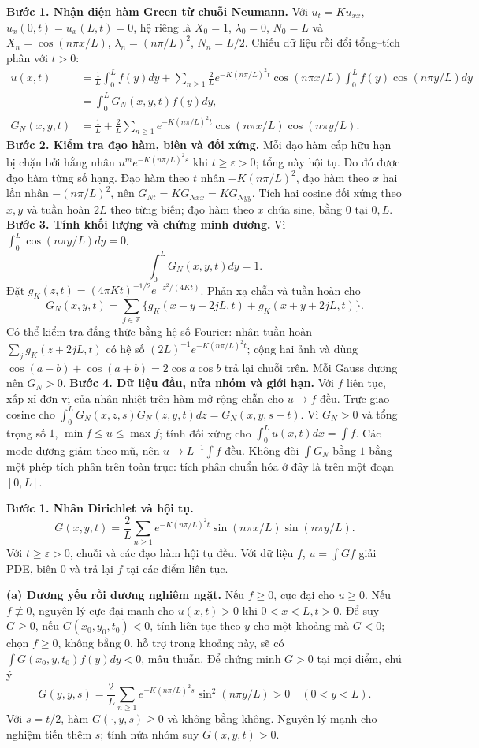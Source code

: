 \textbf{Bước 1. Nhận diện hàm Green từ chuỗi Neumann.}
Với $u_t=Ku_{xx}$, $u_x(0,t)=u_x(L,t)=0$, hệ riêng là $X_0=1$, $\lambda_0=0$, $N_0=L$ và $X_n=\cos(n\pi x/L)$, $\lambda_n=(n\pi/L)^2$, $N_n=L/2$. Chiếu dữ liệu rồi đổi tổng–tích phân với $t>0$:
\begin{align*}
u(x,t)&=\frac1L\int_0^Lf(y)dy+
\sum_{n\ge1}\frac2L e^{-K(n\pi/L)^2t}\cos(n\pi x/L)\int_0^Lf(y)\cos(n\pi y/L)dy\\
&=\int_0^LG_N(x,y,t)f(y)dy,\\
G_N(x,y,t)&=\frac1L+\frac2L\sum_{n\ge1}e^{-K(n\pi/L)^2t}
\cos(n\pi x/L)\cos(n\pi y/L).
\end{align*}
\textbf{Bước 2. Kiểm tra đạo hàm, biên và đối xứng.}
Mỗi đạo hàm cấp hữu hạn bị chặn bởi hằng nhân $n^m e^{-K(n\pi/L)^2\varepsilon}$ khi $t\ge\varepsilon>0$; tổng này hội tụ. Do đó được đạo hàm từng số hạng. Đạo hàm theo $t$ nhân $-K(n\pi/L)^2$, đạo hàm theo $x$ hai lần nhân $-(n\pi/L)^2$, nên $G_{Nt}=KG_{Nxx}=KG_{Nyy}$. Tích hai cosine đối xứng theo $x,y$ và tuần hoàn $2L$ theo từng biến; đạo hàm theo $x$ chứa sine, bằng $0$ tại $0,L$.
\textbf{Bước 3. Tính khối lượng và chứng minh dương.} Vì $\int_0^L\cos(n\pi y/L)dy=0$,
\[\int_0^LG_N(x,y,t)dy=1.\]
Đặt $g_K(z,t)=(4\pi Kt)^{-1/2}e^{-z^2/(4Kt)}$. Phản xạ chẵn và tuần hoàn cho
\[G_N(x,y,t)=\sum_{j\in\mathbb Z}\{g_K(x-y+2jL,t)+g_K(x+y+2jL,t)\}.\]
Có thể kiểm tra đẳng thức bằng hệ số Fourier: nhân tuần hoàn $\sum_jg_K(z+2jL,t)$ có hệ số $(2L)^{-1}e^{-K(n\pi/L)^2t}$; cộng hai ảnh và dùng $\cos(a-b)+\cos(a+b)=2\cos a\cos b$ trả lại chuỗi trên. Mỗi Gauss dương nên $G_N>0$.
\textbf{Bước 4. Dữ liệu đầu, nửa nhóm và giới hạn.} Với $f$ liên tục, xấp xỉ đơn vị của nhân nhiệt trên hàm mở rộng chẵn cho $u\to f$ đều. Trực giao cosine cho $\int_0^LG_N(x,z,s)G_N(z,y,t)dz=G_N(x,y,s+t)$. Vì $G_N>0$ và tổng trọng số $1$, $\min f\le u\le\max f$; tính đối xứng cho $\int_0^Lu(x,t)dx=\int f$. Các mode dương giảm theo mũ, nên $u\to L^{-1}\int f$ đều. Không đòi $\int G_N$ bằng $1$ bằng một phép tích phân trên toàn trục: tích phân chuẩn hóa ở đây là trên một đoạn $[0,L]$.

\textbf{Bước 1. Nhân Dirichlet và hội tụ.}
\[G(x,y,t)=\frac2L\sum_{n\ge1}e^{-K(n\pi/L)^2t}
\sin(n\pi x/L)\sin(n\pi y/L).\]
Với $t\ge\varepsilon>0$, chuỗi và các đạo hàm hội tụ đều. Với dữ liệu $f$, $u=\int Gf$ giải PDE, biên $0$ và trả lại $f$ tại các điểm liên tục.

\textbf{(a) Dương yếu rồi dương nghiêm ngặt.}
Nếu $f\ge0$, cực đại cho $u\ge0$. Nếu $f\not\equiv0$, nguyên lý cực đại mạnh cho $u(x,t)>0$ khi $0<x<L,t>0$. Để suy $G\ge0$, nếu $G(x_0,y_0,t_0)<0$, tính liên tục theo $y$ cho một khoảng mà $G<0$; chọn $f\ge0$, không bằng $0$, hỗ trợ trong khoảng này, sẽ có $\int G(x_0,y,t_0)f(y)dy<0$, mâu thuẫn. Để chứng minh $G>0$ tại mọi điểm, chú ý
\[G(y,y,s)=\frac2L\sum_{n\ge1}e^{-K(n\pi/L)^2s}\sin^2(n\pi y/L)>0\quad(0<y<L).\]
Với $s=t/2$, hàm $G(\cdot,y,s)\ge0$ và không bằng không. Nguyên lý mạnh cho nghiệm tiến thêm $s$; tính nửa nhóm suy $G(x,y,t)>0$.


